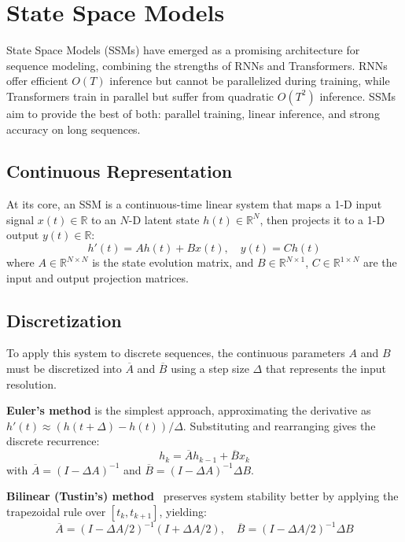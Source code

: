 \section{State Space Models}

State Space Models (SSMs) have emerged as a promising architecture for sequence modeling, combining the strengths of RNNs and Transformers. RNNs offer efficient $O(T)$ inference but cannot be parallelized during training, while Transformers train in parallel but suffer from quadratic $O(T^2)$ inference. SSMs aim to provide the best of both: parallel training, linear inference, and strong accuracy on long sequences.

\subsection{Continuous Representation}
At its core, an SSM is a continuous-time linear system that maps a 1-D input signal $x(t) \in \mathbb{R}$ to an $N$-D latent state $h(t) \in \mathbb{R}^N$, then projects it to a 1-D output $y(t) \in \mathbb{R}$:
\begin{equation}
    h'(t) = A h(t) + B x(t), \quad y(t) = C h(t)
\end{equation}
where $A \in \mathbb{R}^{N \times N}$ is the state evolution matrix, and $B \in \mathbb{R}^{N \times 1}$, $C \in \mathbb{R}^{1 \times N}$ are the input and output projection matrices.

\subsection{Discretization}
To apply this system to discrete sequences, the continuous parameters $A$ and $B$ must be discretized into $\overline{A}$ and $\overline{B}$ using a step size $\Delta$ that represents the input resolution.

\textbf{Euler's method} is the simplest approach, approximating the derivative as $h'(t) \approx (h(t+\Delta) - h(t))/\Delta$. Substituting and rearranging gives the discrete recurrence:
\begin{equation}
    h_k = \overline{A} h_{k-1} + \overline{B} x_k
\end{equation}
with $\overline{A} = (I - \Delta A)^{-1}$ and $\overline{B} = (I - \Delta A)^{-1} \Delta B$.

\textbf{Bilinear (Tustin's) method}~\cite{bilinear} preserves system stability better by applying the trapezoidal rule over $[t_k, t_{k+1}]$, yielding:
\begin{equation}
    \overline{A} = (I - \Delta A / 2)^{-1} (I + \Delta A / 2), \quad \overline{B} = (I - \Delta A / 2)^{-1} \Delta B
\end{equation}

